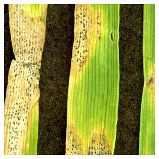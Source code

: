 \begin{figure}[htbp]
{\begin{minipage}[t]{.2\textwidth}
          \includegraphics[width=\textwidth, natwidth=300, natheight=300]{resource/3.3叶枯病(3).jpg} \
        \end{minipage}
      }
\end{figure}
